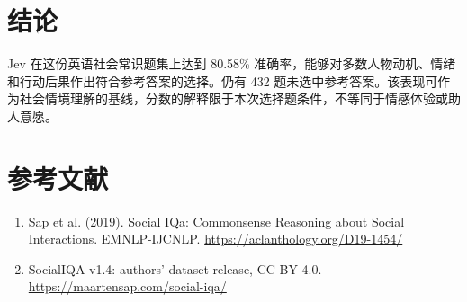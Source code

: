 \documentclass[10pt,a4paper,fontset=fandol]{ctexart}
\begin{document}
\section{结论}
Jev 在这份英语社会常识题集上达到 80.58\% 准确率，能够对多数人物动机、情绪和行动后果作出符合参考答案的选择。仍有 432 题未选中参考答案。该表现可作为社会情境理解的基线，分数的解释限于本次选择题条件，不等同于情感体验或助人意愿。
\section*{参考文献}
\begin{enumerate}
\item Sap et al. (2019). Social IQa: Commonsense Reasoning about Social Interactions. EMNLP-IJCNLP. \url{https://aclanthology.org/D19-1454/}
\item SocialIQA v1.4: authors’ dataset release, CC BY 4.0. \url{https://maartensap.com/social-iqa/}
\end{enumerate}
\end{document}
